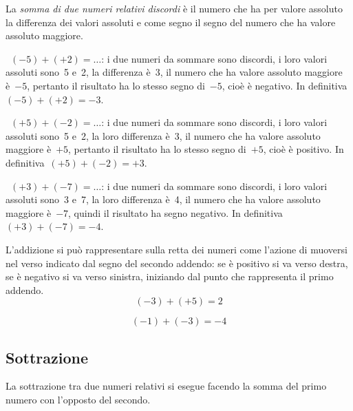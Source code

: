 La \emph{somma di due numeri relativi discordi} è il numero che ha per valore assoluto la differenza dei valori assoluti
e come segno il segno del numero che ha valore assoluto maggiore.

\begin{exrig}
 \begin{esempio}
~$(-5)+(+2)=\ldots$: i due numeri da sommare sono discordi, i loro valori assoluti sono~5 e~2, la differenza è~3,
il numero che ha valore assoluto maggiore è~$-5$, pertanto il risultato ha lo stesso segno di~$-5$, cioè è negativo.
In definitiva~$(-5)+(+2)=-3$.
 \end{esempio}

 \begin{esempio}
~$(+5)+(-2)=\ldots$: i due numeri da sommare sono discordi, i loro valori assoluti sono~5 e~2, la loro differenza è~3,
il numero che ha valore assoluto maggiore è~$+5$, pertanto il risultato ha lo stesso segno di~$+5$,
cioè è positivo. In definitiva~$(+5)+(-2)=+3$.
 \end{esempio}

 \begin{esempio}
~$(+3)+(-7)=\ldots$: i due numeri da sommare sono discordi, i loro valori assoluti sono~3 e~7, la loro differenza è~4,
il numero che ha valore assoluto maggiore è~$-7$, quindi il risultato ha segno negativo.
In definitiva~$(+3)+(-7)=-4$.
 \end{esempio}
\end{exrig}

L'addizione si può rappresentare sulla retta dei numeri come l'azione di muoversi nel verso indicato dal segno del
secondo addendo: se è positivo si va verso destra, se è negativo si va verso sinistra, iniziando dal punto che
rappresenta il primo addendo.
 \[(-3)+(+5)=2\]
\begin{center}
 
\end{center}

\[ (-1)+(-3) = -4\]
\begin{center}
 
\end{center}

\ovalbox{\risolvii \ref{ese:2.6}, \ref{ese:2.7}, \ref{ese:2.8}}
\subsection{Sottrazione}

La sottrazione tra due numeri relativi si esegue facendo la somma del primo numero con l'opposto del secondo.

